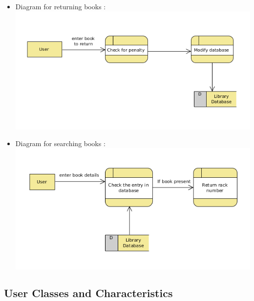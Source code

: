 \documentclass{article}
\begin{document}
\begin{itemize}
\begin{itemize}
\item Diagram for returning books : \\ \includegraphics[scale=0.5]{images/dfdDiagReturnBook.png}\\
\item Diagram for searching books : \\ \includegraphics[scale=0.5]{images/dfdDiagSearch.png}\\
\end{itemize}
\end{itemize}

\subsection{User Classes and Characteristics}
\end{document}
